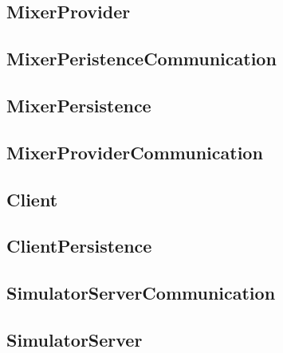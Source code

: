 \subsection{MixerProvider}

\subsection{MixerPeristenceCommunication}

\subsection{MixerPersistence}

\subsection{MixerProviderCommunication}

\subsection{Client}

\subsection{ClientPersistence}

\subsection{SimulatorServerCommunication}

\subsection{SimulatorServer}

